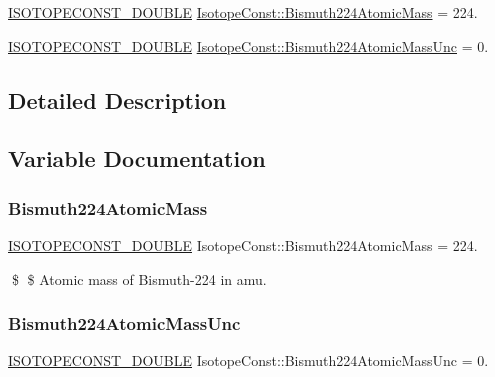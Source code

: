 \begin{DoxyCompactItemize}
\item 
\mbox{\hyperlink{group___isotope_const-_macros_ga8f45a7272ce02c0b4c65c44636ed719a}{I\+S\+O\+T\+O\+P\+E\+C\+O\+N\+S\+T\+\_\+\+D\+O\+U\+B\+LE}} \mbox{\hyperlink{group___isotope_const-_bismuth-_bi224_ga148052c067809397b91c13144c1d1330}{Isotope\+Const\+::\+Bismuth224\+Atomic\+Mass}} = 224.
\item 
\mbox{\hyperlink{group___isotope_const-_macros_ga8f45a7272ce02c0b4c65c44636ed719a}{I\+S\+O\+T\+O\+P\+E\+C\+O\+N\+S\+T\+\_\+\+D\+O\+U\+B\+LE}} \mbox{\hyperlink{group___isotope_const-_bismuth-_bi224_gac5fbe9f5b672477e8fdec0b7c6327018}{Isotope\+Const\+::\+Bismuth224\+Atomic\+Mass\+Unc}} = 0.
\end{DoxyCompactItemize}


\subsection{Detailed Description}


\subsection{Variable Documentation}
\mbox{\label{group___isotope_const-_bismuth-_bi224_ga148052c067809397b91c13144c1d1330}} 
\subsubsection{\texorpdfstring{Bismuth224\+Atomic\+Mass}{Bismuth224AtomicMass}}
{\footnotesize\ttfamily \mbox{\hyperlink{group___isotope_const-_macros_ga8f45a7272ce02c0b4c65c44636ed719a}{I\+S\+O\+T\+O\+P\+E\+C\+O\+N\+S\+T\+\_\+\+D\+O\+U\+B\+LE}} Isotope\+Const\+::\+Bismuth224\+Atomic\+Mass = 224.}

\$ \$ Atomic mass of Bismuth-\/224 in amu. \mbox{\label{group___isotope_const-_bismuth-_bi224_gac5fbe9f5b672477e8fdec0b7c6327018}} 
\subsubsection{\texorpdfstring{Bismuth224\+Atomic\+Mass\+Unc}{Bismuth224AtomicMassUnc}}
{\footnotesize\ttfamily \mbox{\hyperlink{group___isotope_const-_macros_ga8f45a7272ce02c0b4c65c44636ed719a}{I\+S\+O\+T\+O\+P\+E\+C\+O\+N\+S\+T\+\_\+\+D\+O\+U\+B\+LE}} Isotope\+Const\+::\+Bismuth224\+Atomic\+Mass\+Unc = 0.}

